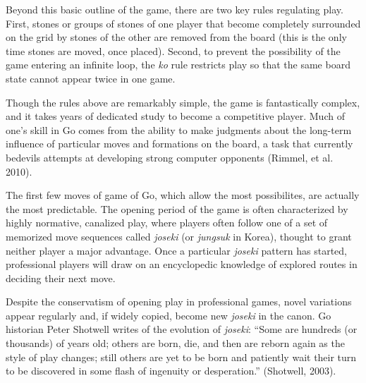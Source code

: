 \documentclass{article}
\begin{document}
Beyond this basic outline of the game, there are two key rules regulating play.  First, stones or groups of stones of one player that become completely surrounded on the grid by stones of the other are removed from the board (this is the only time stones are moved, once placed).  Second, to prevent the possibility of the game entering an infinite loop, the \textit{ko} rule restricts play so that the same board state cannot appear twice in one game.

Though the rules above are remarkably simple, the game is fantastically complex, and it takes years of dedicated study to become a competitive player.  Much of one's skill in Go comes from the ability to make judgments about the long-term influence of particular moves and formations on the board, a task that currently bedevils attempts at developing strong computer opponents (Rimmel, et al. 2010). 

The first few moves of game of Go, which allow the most possibilites, are actually the most predictable.  The opening period of the game is often characterized by highly normative, canalized play, where players often follow one of a set of memorized move sequences called \textit{joseki} (or \textit{jungsuk} in Korea), thought to grant neither player a major advantage.  Once a particular \textit{joseki} pattern has started, professional players will draw on an encyclopedic knowledge of explored routes in deciding their next move.

Despite the conservatism of opening play in professional games, novel variations appear regularly and, if widely copied, become new \textit{joseki} in the canon.  Go historian Peter Shotwell writes of the evolution of \textit{joseki}: ``Some are hundreds (or thousands) of years old; others are born, die, and then are reborn again as the style of play changes; still others are yet to be born and patiently wait their turn to be discovered in some flash of ingenuity or desperation.'' (Shotwell, 2003).
\end{document}
